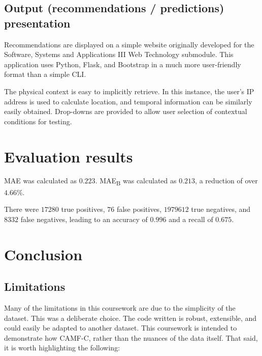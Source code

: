 \documentclass[conference]{IEEEtran}
\begin{document}
\subsection{Output (recommendations / predictions) presentation}

Recommendations are displayed on a simple website originally developed for the Software, Systems and Applications III Web Technology submodule. This application uses Python, Flask, and Bootstrap in a much more user-friendly format than a simple CLI.

The physical context is easy to implicitly retrieve. In this instance, the user's IP address is used to calculate location, and temporal information can be similarly easily obtained. Drop-downs are provided to allow user selection of contextual conditions for testing. 

\section{Evaluation results}

MAE was calculated as $0.223$. MAE\textsubscript{B} was calculated as $0.213$, a reduction of over $4.66\%$. 

There were $17280$ true positives, $76$ false positives, $1979612$ true negatives, and $8332$ false negatives, leading to an accuracy of $0.996$ and a recall of $0.675$.

\section{Conclusion}

\subsection{Limitations}

Many of the limitations in this coursework are due to the simplicity of the dataset. This was a deliberate choice. The code written is robust, extensible, and could easily be adapted to another dataset. This coursework is intended to demonstrate how CAMF-C, rather than the nuances of the data itself. That said, it is worth highlighting the following:
\end{document}
